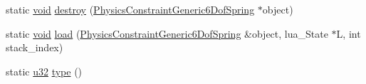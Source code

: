 \begin{DoxyCompactItemize}
\item 
static \mbox{\hyperlink{_thread_8h_af1e856da2e658414cb2456cb6f7ebc66}{void}} \mbox{\hyperlink{classnjli_1_1_physics_constraint_generic6_dof_spring_acbcad205ab444a397ec02dfc592fb202}{destroy}} (\mbox{\hyperlink{classnjli_1_1_physics_constraint_generic6_dof_spring}{Physics\+Constraint\+Generic6\+Dof\+Spring}} $\ast$object)
\item 
static \mbox{\hyperlink{_thread_8h_af1e856da2e658414cb2456cb6f7ebc66}{void}} \mbox{\hyperlink{classnjli_1_1_physics_constraint_generic6_dof_spring_aae8d77390d43c2fb72bf71e1f6c486fc}{load}} (\mbox{\hyperlink{classnjli_1_1_physics_constraint_generic6_dof_spring}{Physics\+Constraint\+Generic6\+Dof\+Spring}} \&object, lua\+\_\+\+State $\ast$L, int stack\+\_\+index)
\item 
static \mbox{\hyperlink{_util_8h_a10e94b422ef0c20dcdec20d31a1f5049}{u32}} \mbox{\hyperlink{classnjli_1_1_physics_constraint_generic6_dof_spring_a26622b5bceef3e66e0a3b9f5ac3f60b2}{type}} ()
\end{DoxyCompactItemize}
